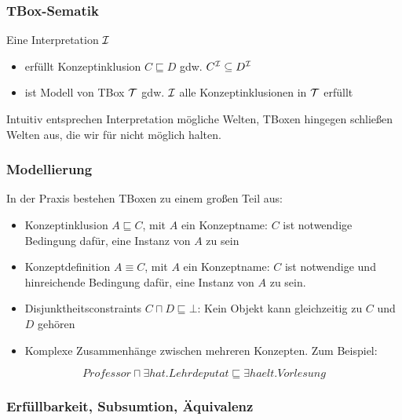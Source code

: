 \subsubsection{TBox-Sematik}\label{tboxsemantik}

\begin{definition} 
Eine Interpretation $\mathcal{I}$
\begin{itemize}
\item
  erfüllt Konzeptinklusion $C \sqsubseteq D$ gdw.
  $C^{\mathcal{I}} \subseteq D^{\mathcal{I}}$
\item
  ist Modell von TBox $\mathcal{T}$ gdw. $\mathcal{I}$ alle Konzeptinklusionen in $\mathcal{T}$
  erfüllt
\end{itemize}
\end{definition}

Intuitiv entsprechen Interpretation mögliche Welten, TBoxen hingegen schließen Welten aus, die wir für nicht möglich halten.

\subsubsection{Modellierung}\label{modellierung}

In der Praxis bestehen TBoxen zu einem großen Teil aus:

\begin{itemize}
\item Konzeptinklusion $A \sqsubseteq C$, mit $A$ ein Konzeptname: $C$ ist notwendige Bedingung dafür, eine Instanz von $A$ zu sein
\item Konzeptdefinition $A \equiv C$, mit $A$ ein Konzeptname: $C$ ist notwendige und hinreichende Bedingung dafür, eine Instanz von $A$ zu sein.
\item Disjunktheitsconstraints $C \sqcap D \sqsubseteq \bot$: Kein Objekt kann gleichzeitig zu $C$ und $D$ gehören
\item Komplexe Zusammenhänge zwischen mehreren Konzepten. Zum Beispiel:
\end{itemize}

$$Professor \sqcap \exists hat.Lehrdeputat \sqsubseteq \exists haelt.Vorlesung$$

\subsubsection{Erfüllbarkeit, Subsumtion, Äquivalenz}\label{erfuxfcllbarkeit-subsumtion-uxe4quivalenz-1}

